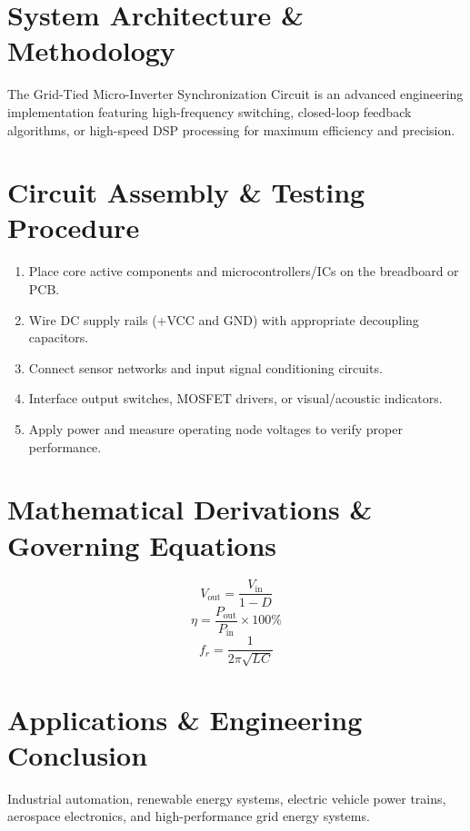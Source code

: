 \documentclass[11pt,a4paper]{article}
\begin{document}
\section{System Architecture \& Methodology}
The Grid-Tied Micro-Inverter Synchronization Circuit is an advanced engineering implementation featuring high-frequency switching, closed-loop feedback algorithms, or high-speed DSP processing for maximum efficiency and precision.

\section{Circuit Assembly \& Testing Procedure}
\begin{enumerate}
    \item Place core active components and microcontrollers/ICs on the breadboard or PCB.
    \item Wire DC supply rails (+VCC and GND) with appropriate decoupling capacitors.
    \item Connect sensor networks and input signal conditioning circuits.
    \item Interface output switches, MOSFET drivers, or visual/acoustic indicators.
    \item Apply power and measure operating node voltages to verify proper performance.
\end{enumerate}

\section{Mathematical Derivations \& Governing Equations}
\begin{equation}
V_{\text{out}} = \frac{V_{\text{in}}}{1 - D}
\end{equation}
\begin{equation}
\eta = \frac{P_{\text{out}}}{P_{\text{in}}} \times 100\%
\end{equation}
\begin{equation}
f_r = \frac{1}{2\pi \sqrt{L C}}
\end{equation}

\section{Applications \& Engineering Conclusion}
Industrial automation, renewable energy systems, electric vehicle power trains, aerospace electronics, and high-performance grid energy systems.
\end{document}
